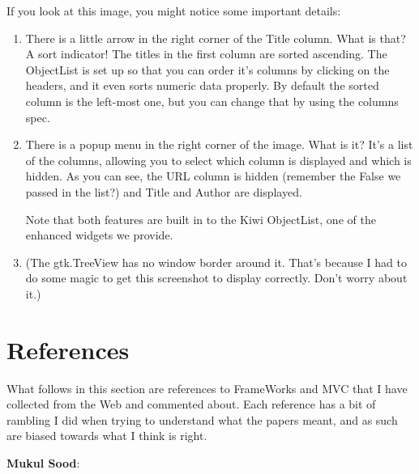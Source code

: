 \documentclass[a4paper]{howto}
\begin{document}
If you look at this image, you might notice some important details:
\begin{enumerate}
\item There is a little arrow in the right corner of the Title column.
What is that? A sort indicator! The titles in the first column are
sorted ascending. The ObjectList is set up so that you can order it's columns
by clicking on the headers, and it even sorts numeric data properly. By
default the sorted column is the left-most one, but you can change that
by using the columns spec.

\item There is a popup menu in the right corner of the image. What is
it? It's a list of the columns, allowing you to select which column is
displayed and which is hidden. As you can see, the URL column is hidden
(remember the False we passed in the  list?) and
Title and Author are displayed.

Note that both features are built in to the Kiwi ObjectList, one of the
enhanced widgets we provide.
\item (The gtk.TreeView has no window border around it. That's because I had to
do some magic to get this screenshot to display correctly. Don't worry
about it.)
\end{enumerate}


\section{References}

What follows in this section are references to FrameWorks and MVC that I
have collected from the Web and commented about. Each reference has a
bit of rambling I did when trying to understand what the papers meant,
and as such are biased towards what I think is right.

{\bf Mukul Sood}:
\end{document}
